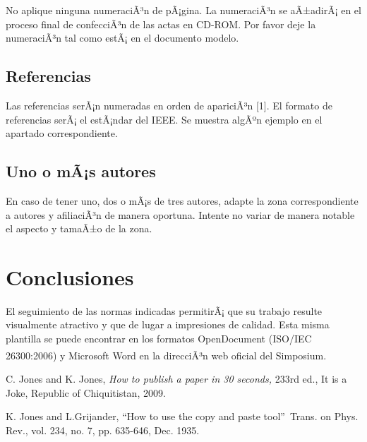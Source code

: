 \documentclass[10pt,conference,a4paper]{IEEEtran}
\begin{document}
No aplique ninguna numeraciÃ³n de pÃ¡gina. La numeraciÃ³n se aÃ±adirÃ¡ en el
proceso final de confecciÃ³n de las actas en CD-ROM. Por favor deje la
numeraciÃ³n tal como estÃ¡ en el documento modelo.

\subsection{Referencias}

Las referencias serÃ¡n numeradas en orden de apariciÃ³n [1]. El formato de
referencias serÃ¡ el estÃ¡ndar del IEEE. Se muestra algÃºn ejemplo en el apartado correspondiente.

\subsection{Uno o mÃ¡s autores}

En caso de tener uno, dos o mÃ¡s de tres autores, adapte la zona
correspondiente a autores y afiliaciÃ³n de manera oportuna. Intente no variar
de manera notable el aspecto y tamaÃ±o de la zona.

\section{Conclusiones}

El seguimiento de las normas indicadas permitirÃ¡ que su trabajo resulte
visualmente atractivo y que de lugar a impresiones de calidad. Esta misma
plantilla se puede encontrar en los formatos OpenDocument (ISO/IEC 26300:2006)
y Microsoft Word\textsuperscript{\textregistered} en la direcciÃ³n web oficial del Simposium.


\begin{thebibliography}{9}                                                                                                %
    C. Jones and K. Jones, \emph{How to publish a paper in 30
	seconds,} 233rd ed., It is a Joke, Republic of Chiquitistan, 2009.

    K. Jones and L.Grijander, \textquotedblleft How to use
	the copy and paste tool\textquotedblright\ Trans. on Phys. Rev., vol. 234, no.
	7, pp. 635-646, Dec. 1935.
\end{thebibliography}
\end{document}
